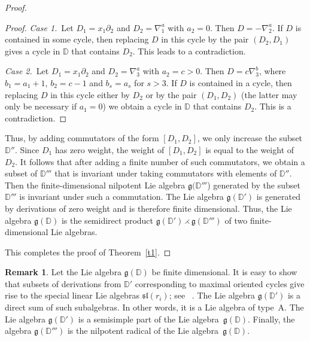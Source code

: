 \documentclass[a4paper, 12pt,oneside,reqno]{amsart}
\numberwithin{equation}{section}
\theoremstyle{definition}
\newtheorem{remark}[theorem]{Remark}
\def\sl{\mathfrak{sl}}
\begin{document}
\begin{proof}
\begin{proof}
{\it Case 1.}\ Let $D_1=x_1\partial_2$ and $D_2=\nabla^a_1$ with $a_2=0$. Then $D=-\nabla^a_2$. If $D$ is contained in some cycle, then replacing $D$ in this cycle by the pair $(D_2, D_1)$ gives a cycle in $\mathbb{D}$ that contains $D_2$. This leads to a contradiction.

{\it Case 2.}\ Let $D_1=x_1\partial_2$ and $D_2=\nabla^a_3$ with $a_2=c>0$. Then $D=c\nabla^b_3$, where $b_1=a_1+1$, $b_2=c-1$ and $b_s=a_s$ for $s>3$. If $D$ is contained in a cycle, then replacing $D$ in this cycle either by $D_2$ or by the pair $(D_1, D_2)$ (the latter may only be necessary if $a_1=0$) we obtain a cycle in $ \mathbb{D}$ that contains $D_2$. This is a contradiction.
\end{proof}


Thus, by adding commutators of the form $[D_1,D_2]$, we only increase the subset $\mathbb{D}''$. Since $D_1$ has zero weight, the weight of $[D_1,D_2]$ is equal to the weight of $D_2$. It follows that after adding a finite number of such commutators, we obtain a subset of $\mathbb{D}'''$ that is invariant under taking commutators with elements of $\mathbb{D}''$. Then the finite-dimensional nilpotent Lie algebra $\mathfrak{g}(\mathbb{D}'''$) generated by the subset $\mathbb{D}'''$ is invariant under such a commutation. The Lie algebra $\mathfrak{g}(\mathbb{D}')$ is generated by derivations of zero weight and is therefore finite dimensional. Thus, the Lie algebra $\mathfrak{g}(\mathbb{D})$ is the semidirect product $\mathfrak{g}(\mathbb{D}') \rightthreetimes \mathfrak{g}(\mathbb{D}''')$ of two finite-dimensional Lie algebras. 

\smallskip

This completes the proof of Theorem~\ref{t1}.
\end{proof}

\begin{remark} \label{r1}
Let the Lie algebra $\mathfrak{g}(\mathbb{D})$ be finite dimensional. It is easy to show that subsets of derivations from $\mathbb{D}'$ corresponding to maximal oriented cycles give rise to the special linear Lie algebras $\sl(r_i)$; see ~\cite[Proposition~4.4]{ALS}. The Lie algebra $\mathfrak{g}(\mathbb{D}')$ is a direct sum of such subalgebras. In other words, it is a Lie algebra of type~A. The Lie algebra $\mathfrak{g}(\mathbb{D}')$ is a semisimple part of the Lie algebra~$\mathfrak{g}(\mathbb{D})$. Finally, the algebra $\mathfrak{g}(\mathbb{D}''')$ is the nilpotent radical of the Lie algebra~$\mathfrak{g}(\mathbb{D})$. 
\end{remark}
\end{document}

